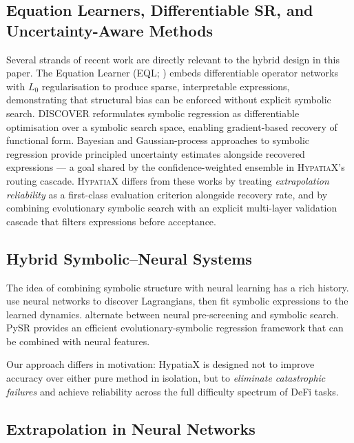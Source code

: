\documentclass[twoside,11pt]{article}
\begin{document}
\subsection{Equation Learners, Differentiable SR, and Uncertainty-Aware Methods}\label{subsec:equation-learners-differentiable-sr-and-}
\label{sec:related_eq}

Several strands of recent work are directly relevant to the hybrid design in
this paper.  The Equation Learner (EQL; \citealt{sahoo2018eql}) embeds
differentiable operator networks with $L_0$ regularisation to produce sparse,
interpretable expressions, demonstrating that structural bias can be enforced
without explicit symbolic search.  DISCOVER \citep{liu2022discover} reformulates
symbolic regression as differentiable optimisation over a symbolic search space,
enabling gradient-based recovery of functional form.  Bayesian and
Gaussian-process approaches to symbolic regression \citep{jin2020bayesian}
provide principled uncertainty estimates alongside recovered expressions ---
a goal shared by the confidence-weighted ensemble in \textsc{HypatiaX}'s
routing cascade.  \textsc{HypatiaX} differs from these works by treating
\emph{extrapolation reliability} as a first-class evaluation criterion
alongside recovery rate, and by combining evolutionary symbolic search with an
explicit multi-layer validation cascade that filters expressions before
acceptance.

\subsection{Hybrid Symbolic--Neural Systems}\label{subsec:hybrid-symbolicneural-systems}
\label{sec:related_hybrid}

The idea of combining symbolic structure with neural learning has a rich history.
\citet{cranmer2020lagrangian} use neural networks to discover Lagrangians, then
fit symbolic expressions to the learned dynamics.  \citet{udrescu2020ai} alternate
between neural pre-screening and symbolic search.  PySR \citep{cranmer2023pysr}
provides an efficient evolutionary-symbolic regression framework that can be
combined with neural features.

Our approach differs in motivation: HypatiaX is designed not to improve accuracy
over either pure method in isolation, but to \emph{eliminate catastrophic failures}
and achieve reliability across the full difficulty spectrum of DeFi tasks.

\subsection{Extrapolation in Neural Networks}\label{subsec:extrapolation-in-neural-networks}
\label{sec:related_extrap}
\end{document}
